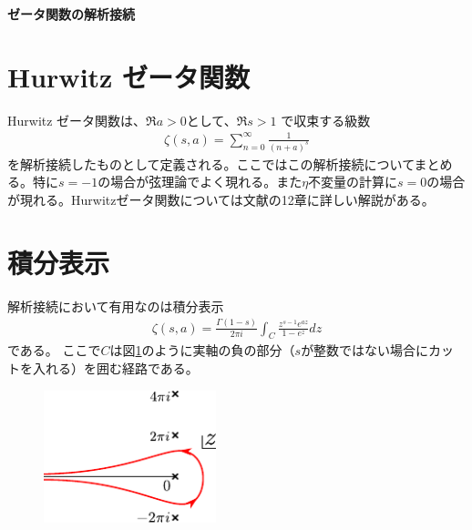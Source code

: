 \documentclass[12pt,a4paper,dvipdfmx]{jlreq}
\begin{document}
{\bfseries \LARGE ゼータ関数の解析接続}
\section{Hurwitz ゼータ関数}
Hurwitz ゼータ関数は、$\Re a>0$として、$\Re s>1$ で収束する級数
\begin{align}
  \zeta(s,a)=\sum_{n=0}^{\infty}\frac{1}{(n+a)^s}
  \label{zeta}
\end{align}
を解析接続したものとして定義される。ここではこの解析接続についてまとめる。特に$s=-1$の場合が弦理論でよく現れる。また$\eta$不変量の計算に$s=0$の場合が現れる。Hurwitzゼータ関数については文献\cite{Apostol}の12章に詳しい解説がある。
\section{積分表示}
解析接続において有用なのは積分表示
\begin{align}
  \zeta(s,a)=\frac{\Gamma(1-s)}{2\pi i}\int_C \frac{z^{s-1}e^{az}}{1-e^{z}}dz
\label{integral-representation}
\end{align}
である。
ここで$C$は図\ref{fig:contour}のように実軸の負の部分（$s$が整数ではない場合にカットを入れる）を囲む経路である。
\begin{figure}[htbp]
  \centering
  \includegraphics[width=5cm]{path.pdf}
  \caption{}
  \label{fig:contour}
\end{figure}
\end{document}
